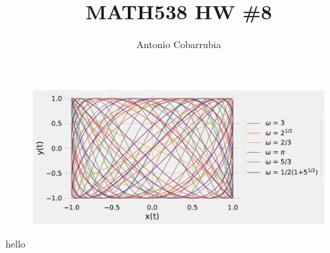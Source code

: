 \documentclass[11pt]{article}
\title{MATH538 HW \#8}
\author{Antonio Cobarrubia}
\begin{document}
\maketitle
\begin{figure}[H]
    \centering
    \includegraphics[width = 12 cm]{src/parametric.pdf}
    \caption{ }
    \label{fig:my_label}
\end{figure}
hello
\end{document}
